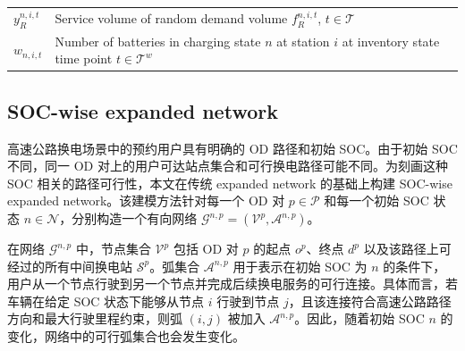 \documentclass[12pt,hyperref,a4paper,UTF8]{ctexart}
\begin{document}
\begin{table}[!htbp]
\begin{tabular}{@{}lp{13cm}@{}}
    $y_{R}^{n,i,t}$ & Service volume of random demand volume $f_{R}^{n,i,t}$, $t\in\mathcal{T}$\\
    $w_{n,i,t}$ & Number of batteries in charging state $n$ at station $i$ at inventory state time point $t\in\mathcal{T}^{w}$ \\
    \bottomrule
  \end{tabular}
\end{table}

\subsection{SOC-wise expanded network}

高速公路换电场景中的预约用户具有明确的 OD 路径和初始 SOC。由于初始 SOC 不同，同一 OD 对上的用户可达站点集合和可行换电路径可能不同。为刻画这种 SOC 相关的路径可行性，本文在传统 expanded network 的基础上构建 SOC-wise expanded network。该建模方法针对每一个 OD 对 $p\in\mathcal{P}$ 和每一个初始 SOC 状态 $n\in\mathcal{N}$，分别构造一个有向网络 $\mathcal{G}^{n,p}=(\mathcal{V}^{p},\mathcal{A}^{n,p})$。

在网络 $\mathcal{G}^{n,p}$ 中，节点集合 $\mathcal{V}^{p}$ 包括 OD 对 $p$ 的起点 $o^p$、终点 $d^p$ 以及该路径上可经过的所有中间换电站 $\mathcal{S}^{p}$。弧集合 $\mathcal{A}^{n,p}$ 用于表示在初始 SOC 为 $n$ 的条件下，用户从一个节点行驶到另一个节点并完成后续换电服务的可行连接。具体而言，若车辆在给定 SOC 状态下能够从节点 $i$ 行驶到节点 $j$，且该连接符合高速公路路径方向和最大行驶里程约束，则弧 $(i,j)$ 被加入 $\mathcal{A}^{n,p}$。因此，随着初始 SOC $n$ 的变化，网络中的可行弧集合也会发生变化。
\end{document}
